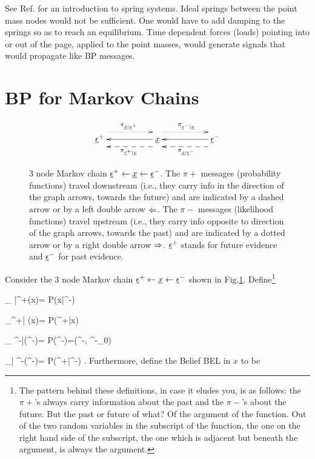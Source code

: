 See Ref.\cite{wiki-spring-net}
for an introduction to spring systems.
Ideal springs between the point mass
nodes would
not be sufficient.
One would have to add damping to
the springs so as
to reach an equilibrium.
Time dependent forces (loads)
pointing into or out of the page, applied
to the point masses, would
generate signals that would
propagate
like BP messages.



\section{BP for Markov Chains}
\begin{figure}[h!]
$$\xymatrix{
\rveps^+
\ar@{.>}@<2ex>[rr]^{\pi_{\rvx|\rveps^+}}
\ar@{<--}@<-2ex>[rr]_{\pi_{\rveps^+|\rvx}}
&&
\rvx\ar[ll]
\ar@{.>}@<2ex>[rr]^{\pi_{\rveps^-|\rvx}}
\ar@{<--}@<-2ex>[rr]_{\pi_{\rvx|\rveps^-}}
&&
\rveps^-\ar[ll]
}$$
\caption{3 node Markov chain
$\underline{\epsilon}^+\leftarrow{\underline{x}}\leftarrow \underline{\epsilon}^-$.
The $\pi+$  messages
(probability functions)
travel downstream (i.e.,
they carry info
in the direction
of the graph arrows, towards the future)
and are indicated by a dashed arrow
or by a left double arrow $\Leftarrow$.
The $\pi-$  messages
(likelihood functions) travel
upstream (i.e., they
carry info opposite to
direction of the graph arrows,
towards the past)
and are indicated
by a dotted arrow
or by a right double arrow $\Rightarrow$.
$\underline{\epsilon}^+$
stands for future evidence and
$\underline{\epsilon}^-$ for past evidence.
}
\label{fig-mp-3chain}
\end{figure}

Consider the
3 node Markov chain
$\underline{\epsilon}^+\leftarrow{\underline{x}}\leftarrow \underline{\epsilon}^-$
shown in
Fig.\ref{fig-mp-3chain}.
Define\footnote{The pattern
behind these definitions,
in case it eludes you,
is as follows: the $\pi+$'s
always carry information
about the past
and the $\pi-$'s
about the future.
But the past or future of
what? Of the argument
of the function.
Out  of the
two random variables
in the subscript
of the function,
the one on the
right hand side
of the subscript,
the  one which
is adjacent but beneath
 the argument, is always the
argument.}


\beq
\pi_{ \rvx|\rveps^+}(x)=
P(x|\eps^-)
\eeq

\beq
\pi_{\rveps^+| \rvx}(x)=
P(\eps^+|x)
\eeq

\beq
\pi_{ \rveps^-|\rvx}(\eps^-)=
P(\eps^-)=\delta(\eps^-, \eps^-_0)
\eeq

\beq
\pi_{\rvx| \rveps^-}(\eps^-)=
P(\eps^+|\eps^-)
\;.
\eeq
Furthermore,
define the Belief BEL
in $x$
to be

